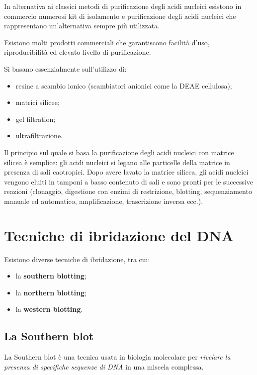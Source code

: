 \documentclass[]{article}
\begin{document}
In alternativa ai classici metodi di purificazione degli acidi nucleici
esistono in commercio numerosi kit di isolamento e purificazione degli
acidi nucleici che rappresentano un'alternativa sempre più utilizzata.

Esistono molti prodotti commerciali che garantiscono facilità d'uso,
riproducibilità ed elevato livello di purificazione.

Si basano essenzialmente sull'utilizzo di:

\begin{itemize}
\itemsep1pt\parskip0pt
\item
  resine a scambio ionico (scambiatori anionici come la DEAE cellulosa);
\item
  matrici silicee;
\item
  gel filtration;
\item
  ultrafiltrazione.
\end{itemize}

Il principio sul quale si basa la purificazione degli acidi nucleici con
matrice silicea è semplice: gli acidi nucleici si legano alle particelle
della matrice in presenza di sali caotropici. Dopo avere lavato la
matrice silicea, gli acidi nucleici vengono eluiti in tamponi a basso
contenuto di sali e sono pronti per le successive reazioni (clonaggio,
digestione con enzimi di restrizione, blotting, sequenziamento manuale
ed automatico, amplificazione, trascrizione inversa ecc.).

\section{Tecniche di ibridazione del
DNA}\label{tecniche-di-ibridazione-del-dna}

Esistono diverse tecniche di ibridazione, tra cui:

\begin{itemize}
\itemsep1pt\parskip0pt
\item
  la \textbf{southern blotting};
\item
  la \textbf{northern blotting};
\item
  la \textbf{western blotting}.
\end{itemize}

\subsection{La Southern blot}\label{la-southern-blot}

La Southern blot è una tecnica usata in biologia molecolare per
\emph{rivelare la presenza di specifiche sequenze di DNA} in una miscela
complessa.
\end{document}
